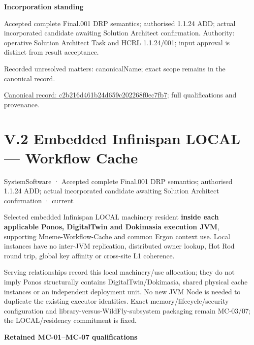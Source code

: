 \par\medskip\textbf{Incorporation standing}\par


Accepted complete Final.001 DRP semantics; authorised 1.1.24 ADD; actual incorporated candidate awaiting Solution Architect confirmation. Authority: operative Solution Architect Task and HCRL 1.1.24/001; input approval is distinct from result acceptance.


{\small Recorded unresolved matters: canonicalName; exact scope remains in the canonical record.}\par
{\footnotesize \href{../../../../../../../continuum/technology/system-software/c2b216d461b24d659c202268f0ec7fb7.md}{Canonical record: c2b216d461b24d659c202268f0ec7fb7}; full qualifications and provenance.}\par
\chapter*{V.2 Embedded Infinispan LOCAL — Workflow Cache}
\label{navigation:V.2}

\label{element:4048a6c775c542b6a29610d9e248a4d8}
{\small SystemSoftware · Accepted complete Final.001 DRP semantics; authorised 1.1.24 ADD; actual incorporated candidate awaiting Solution Architect confirmation · current}\par

Selected embedded Infinispan LOCAL machinery resident \textbf{inside each applicable Ponos, DigitalTwin and Dokimasia execution JVM}, supporting Mneme-Workflow-Cache and common Ergon context use. Local instances have no inter-JVM replication, distributed owner lookup, Hot Rod round trip, global key affinity or cross-site L1 coherence.



Serving relationships record this local machinery/use allocation; they do not imply Ponos structurally contains DigitalTwin/Dokimasia, shared physical cache instances or an independent deployment unit. No new JVM Node is needed to duplicate the existing executor identities. Exact memory/lifecycle/security configuration and library-versus-WildFly-subsystem packaging remain MC-03/07; the LOCAL/residency commitment is fixed.



\par\medskip\textbf{Retained MC-01–MC-07 qualifications}\par



